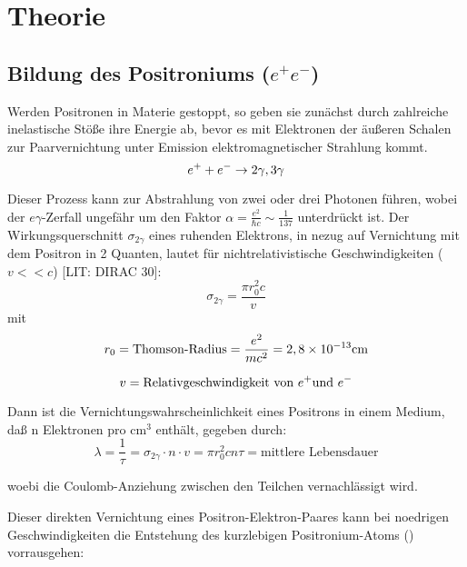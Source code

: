 \section{Theorie}

\subsection{Bildung des Positroniums ($e^+ e^-$)}

Werden Positronen \positron in Materie gestoppt, so geben sie zunächst durch zahlreiche inelastische Stöße ihre Energie ab, bevor es mit Elektronen \elektron der äußeren Schalen zur Paarvernichtung unter Emission elektromagnetischer Strahlung kommt.
\begin{equation*}
 e^+ + e^- \rightarrow 2\gamma , 3\gamma
\end{equation*}

Dieser Prozess kann zur Abstrahlung von zwei oder drei Photonen führen, wobei der $e\gamma$-Zerfall ungefähr um den Faktor $\alpha = \frac{e^2}{\hbar c} \sim \frac{1}{137}$ unterdrückt ist. Der Wirkungsquerschnitt $\sigma_{2\gamma}$ eines ruhenden Elektrons, in nezug auf Vernichtung mit dem Positron in 2 Quanten, lautet für nichtrelativistische Geschwindigkeiten ($ v << c$) [LIT: DIRAC 30]:
\begin{equation*}
 \sigma_{2\gamma} = \frac{\pi r_0^2 c}{v}
\end{equation*}
mit
\begin{equation*}
 r_0 = \text{Thomson-Radius} = \frac{e^2}{mc^2} = 2,8\times 10^{-13}\text{cm}
\end{equation*}

\begin{equation*}
 v = \text{Relativgeschwindigkeit von \ensuremath{e^+}und \ensuremath{e^-}}
\end{equation*}

Dann ist die Vernichtungswahrscheinlichkeit eines Positrons in einem Medium, daß n Elektronen pro $\text{cm}^3$ enthält, gegeben durch:
\begin{equation*}
 \lambda = \frac{1}{\tau} = \sigma_{2\gamma} \cdot n \cdot v = \pi r_0^2 c n   \tau = \text{mittlere Lebensdauer}
\end{equation*}

woebi die Coulomb-Anziehung zwischen den Teilchen vernachlässigt wird.

Dieser direkten Vernichtung eines Positron-Elektron-Paares kann bei noedrigen Geschwindigkeiten die Entstehung des kurzlebigen Positronium-Atoms (\positron \elektron) vorrausgehen:

